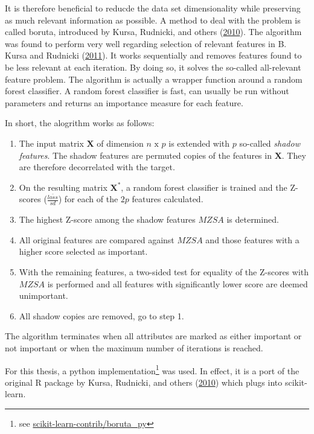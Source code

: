 \documentclass[
  11pt,
  a4paper,
  DIV=12,captions=tableheading,oneside]{scrbook}
\providecommand{\tightlist}{%
  \setlength{\itemsep}{0pt}\setlength{\parskip}{0pt}}
\providecommand{\tightlist}{%
  \setlength{\itemsep}{0pt}\setlength{\parskip}{0pt}}
\begin{document}
It is therefore beneficial to reducde the data set dimensionality while preserving as much relevant information as possible. A method to deal with the problem is called boruta, introduced by Kursa, Rudnicki, and others (\protect\hyperlink{ref-kursa2010boruta}{2010}). The algorithm was found to perform very well regarding selection of relevant features in B. Kursa and Rudnicki (\protect\hyperlink{ref-kursa2011boruta}{2011}). It works sequentially and removes features found to be less relevant at each iteration. By doing so, it solves the so-called all-relevant feature problem.
The algorithm is actually a wrapper function around a random forest classifier. A random forest classifier is fast, can usually be run without parameters and returns an importance measure for each feature.

In short, the alogrithm works as follows:

\begin{enumerate}
\def\labelenumi{\arabic{enumi}.}
\tightlist
\item
  The input matrix \(\mathbf{X}\) of dimension \(n\text{ x }p\) is extended with \(p\) so-called \emph{shadow features}. The shadow features are permuted copies of the features in \(\mathbf{X}\). They are therefore decorrelated with the target.
\item
  On the resulting matrix \(\mathbf{X^*}\), a random forest classifier is trained and the Z-scores (\(\frac{\bar{loss}}{sd}\)) for each of the \(2p\) features calculated.
\item
  The highest Z-score among the shadow features \(MZSA\) is determined.
\item
  All original features are compared against \(MZSA\) and those features with a higher score selected as important.
\item
  With the remaining features, a two-sided test for equality of the Z-scores with \(MZSA\) is performed and all features with significantly lower score are deemed unimportant.
\item
  All shadow copies are removed, go to step 1.
\end{enumerate}

The algorithm terminates when all attributes are marked as either important or not important or when the maximum number of iterations is reached.

For this thesis, a python implementation\footnote{see \href{https://github.com/scikit-learn-contrib/boruta_py}{scikit-learn-contrib/boruta\_py}} was used. In effect, it is a port of the original R package by Kursa, Rudnicki, and others (\protect\hyperlink{ref-kursa2010boruta}{2010}) which plugs into scikit-learn.
\end{document}
